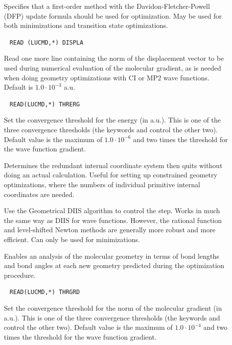 \begin{description}
\item[]
Specifies that a first-order method with the
Davidon-Fletcher-Powell (DFP) update
formula should be used for optimization. May be used for both
minimizations and transition state optimizations.

\item[]\verb| |\newline
\verb|READ (LUCMD,*) DISPLA|

Read one more line containing the norm of the displacement vector to
be used during numerical evaluation of the molecular gradient, as is
needed when doing geometry optimizations with CI or MP2 wave
functions. Default is $1.0\cdot 10^{-3}$ a.u.

\item[]\verb| |
\newline
\verb|READ(LUCMD,*) THRERG|

Set the convergence threshold for the energy (in a.u.). This is one of the three
convergence thresholds (the keywords
 and 
control the other two). Default value is the maximum of $1.0\cdot
10^{-6}$ and two times the threshold for the wave function gradient.

\item[]
Determines the redundant internal coordinate system then quits without
doing an actual calculation. Useful for setting up constrained
geometry optimizations, where the numbers of individual primitive
internal coordinates are needed.

\item[]
Use the Geometrical DIIS\cite{pcppjms114}
algorithm to control the
step. Works in much the same way as DIIS for wave functions. However,
the rational function and level-shifted Newton methods are generally
more robust and more efficient. Can only be used for minimizations.

\item[]
Enables an analysis of the molecular geometry in terms of bond lengths
and bond angles at each new geometry predicted during the optimization
procedure.

\item[]\verb| |
\newline
\verb|READ(LUCMD,*) THRGRD|

Set the convergence threshold for the norm of the molecular gradient (in
a.u.). This is one of
the three convergence thresholds (the keywords  and
 control the other two). Default value is the maximum of
$1.0\cdot 10^{-4}$ and two times the threshold for the wave function
gradient.


\end{description}
